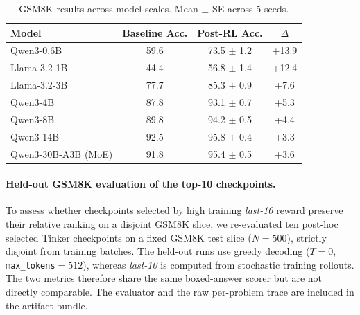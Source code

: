\documentclass{article}
\begin{document}
\begin{table}[htbp]
\centering
\caption{GSM8K results across model scales. Mean $\pm$ SE across 5 seeds.}
\label{tab:results_gsm8k}
\begin{tabular}{lccc}
\toprule
\textbf{Model} & \textbf{Baseline Acc.} & \textbf{Post-RL Acc.} & \textbf{$\Delta$} \\
\midrule
Qwen3-0.6B & 59.6 & 73.5 $\pm$ 1.2 & +13.9 \\
Llama-3.2-1B & 44.4 & 56.8 $\pm$ 1.4 & +12.4 \\
Llama-3.2-3B & 77.7 & 85.3 $\pm$ 0.9 & +7.6 \\
Qwen3-4B & 87.8 & 93.1 $\pm$ 0.7 & +5.3 \\
Qwen3-8B & 89.8 & 94.2 $\pm$ 0.5 & +4.4 \\
Qwen3-14B & 92.5 & 95.8 $\pm$ 0.4 & +3.3 \\
Qwen3-30B-A3B (MoE) & 91.8 & 95.4 $\pm$ 0.5 & +3.6 \\
\bottomrule
\end{tabular}
\end{table}

\paragraph{Held-out GSM8K evaluation of the top-10 checkpoints.}
To assess whether checkpoints selected by high training \emph{last-10} reward
preserve their relative ranking on a disjoint GSM8K slice, we re-evaluated
ten post-hoc selected Tinker checkpoints on a fixed GSM8K test slice
($N=500$), strictly disjoint from training batches. The held-out runs use
greedy decoding ($T{=}0$, \texttt{max\_tokens}$=512$), whereas
\emph{last-10} is computed from stochastic training rollouts. The two
metrics therefore share the same boxed-answer scorer but are not directly
comparable.
The evaluator and the raw per-problem trace are included in the artifact
bundle.
\end{document}
